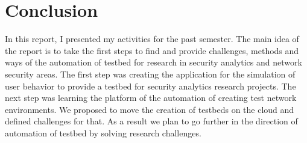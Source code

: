 
\section{Conclusion}

In this report, I presented my activities for the past semester. The main idea of the report is to take the first steps to find and provide challenges, methods and ways of the automation of testbed for research in security analytics and network security areas. The first step was creating the application for the simulation of user behavior to provide a testbed for security analytics research projects. The next step was learning the platform of the automation of creating test network environments. We proposed to move the creation of testbeds on the cloud and defined challenges for that. As a result we plan to go further in the direction of automation of testbed by solving research challenges.